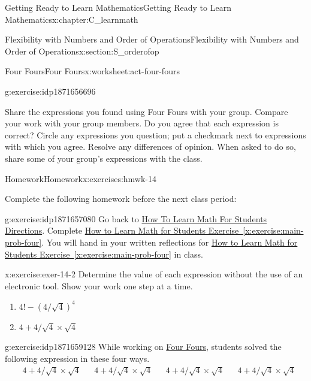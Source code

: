 \documentclass[oneside,10pt,]{book}
\newcommand{\xreffont}{\relax}
\numberwithin{equation}{chapter}
\newcommand{\amp}{&}
\begin{document}
\begin{chapterptx}{Getting Ready to Learn Mathematics}{}{Getting Ready to Learn Mathematics}{}{}{x:chapter:C_learnmath}
\begin{sectionptx}{Flexibility with Numbers and Order of Operations}{}{Flexibility with Numbers and Order of Operations}{}{}{x:section:S_orderofop}
\begin{worksheet-subsection}{Four Fours}{}{Four Fours}{}{}{x:worksheet:act-four-fours}
\begin{divisionexercise}{4}{}{}{g:exercise:idp1871656696}
\end{divisionexercise}%
\begin{conclusion}{}%
Share the expressions you found using Four Fours with your group. Compare your work with your group members. Do you agree that each expression is correct? Circle any expressions you question; put a checkmark next to expressions with which you agree. Resolve any differences of opinion. When asked to do so, share some of your group's expressions with the class.%
\end{conclusion}%
\end{worksheet-subsection}
\restoregeometry
%
%
\typeout{************************************************}
\typeout{************************************************}
%
\begin{exercises-subsection}{Homework}{}{Homework}{}{}{x:exercises:hmwk-14}
\begin{introduction}{}%
Complete the following homework before the next class period:%
\end{introduction}%
\begin{divisionexercise}{1}{}{}{g:exercise:idp1871657080}%
Go back to \hyperlink{x:paragraphs:htlmfs-directions}{How To Learn Math For Students Directions}. Complete \hyperref[x:exercise:main-prob-four]{How to Learn Math for Students Exercise~{\xreffont\ref{x:exercise:main-prob-four}}}. You will hand in your written reflections for \hyperref[x:exercise:main-prob-four]{How to Learn Math for Students Exercise~{\xreffont\ref{x:exercise:main-prob-four}}} in class.%
\end{divisionexercise}%
\begin{divisionexercise}{2}{}{}{x:exercise:exer-14-2}%
Determine the value of each expression without the use of an electronic tool. Show your work one step at a time.%
\begin{enumerate}[font=\bfseries,label=(\alph*),ref=\alph*]
\item\label{x:task:exer-14-2a}\(4! - \left(4/ \sqrt{4} \right)^{4}\)%
\item{}\(4 + 4 / \sqrt{4} \times \sqrt{4}\)%
\end{enumerate}
\end{divisionexercise}%
\begin{divisionexercise}{3}{}{}{g:exercise:idp1871659128}%
While working on \hyperref[x:worksheet:act-four-fours]{Four Fours}, students solved the following expression in these four ways.%
\begin{align*}
\amp 4 + 4 / \sqrt{4} \times \sqrt{4} \amp \amp 4 + 4 / \sqrt{4} \times \sqrt{4} \amp \amp 4 + 4 / \sqrt{4} \times \sqrt{4} \amp \amp 4 + 4 / \sqrt{4} \times \sqrt{4}\\

\end{align*}
\end{divisionexercise}
\end{exercises-subsection}
\end{sectionptx}
\end{chapterptx}
\end{document}
